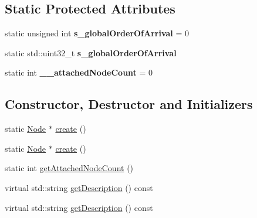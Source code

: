 \begin{DoxyCompactItemize}
\begin{tabbing}
\end{tabbing}\end{DoxyCompactItemize}
\subsection*{Static Protected Attributes}
\begin{DoxyCompactItemize}
\item 
\mbox{\label{classNode_a54da5479d291fb34d32b1d798c8ae2f0}} 
static unsigned int {\bfseries s\+\_\+global\+Order\+Of\+Arrival} = 0
\item 
\mbox{\label{classNode_aafd1ce583f0948ca665e96e6bcf00f11}} 
static std\+::uint32\+\_\+t {\bfseries s\+\_\+global\+Order\+Of\+Arrival}
\item 
\mbox{\label{classNode_a572e900f3b0a5c388a293d35590fa339}} 
static int {\bfseries \+\_\+\+\_\+attached\+Node\+Count} = 0
\end{DoxyCompactItemize}
\subsection*{Constructor, Destructor and Initializers}
\begin{DoxyCompactItemize}
\item 
static \hyperlink{classNode}{Node} $\ast$ \hyperlink{classNode_aa9a92a1756b585d707a42c3fd1b274d4}{create} ()
\item 
static \hyperlink{classNode}{Node} $\ast$ \hyperlink{classNode_a8e23ac4cd34aafe7a332b09d8a9de368}{create} ()
\item 
static int \hyperlink{classNode_a8e964e787155dc3fcb2ff47ec7f75eb3}{get\+Attached\+Node\+Count} ()
\item 
virtual std\+::string \hyperlink{classNode_a41710375a0d92a4ee54c39fe123b5912}{get\+Description} () const
\item 
virtual std\+::string \hyperlink{classNode_a8a54b2b6449d20d852bd3c9f775bb556}{get\+Description} () const
\end{DoxyCompactItemize}
